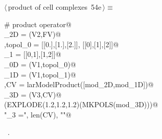 \documentclass[11pt,oneside]{article}    %
\begin{document}
\begin{flushleft} \small \label{scrap91}
\protect{}$\langle\,$product of cell complexes\nobreak\ {\footnotesize 54e}$\,\rangle\equiv$
\vspace{-1ex}
\begin{list}{}{} \item
\mbox{}\verb@# product operator@\\
\mbox{}\verb@mod_2D = (V2,FV)@\\
\mbox{},topol_0 = [[0.],[1.],[2.]], [[0],[1],[2]]@\\
\mbox{}\verb@topol_1 = [[0,1],[1,2]]@\\
\mbox{}\verb@mod_0D = (V1,topol_0)@\\
\mbox{}\verb@mod_1D = (V1,topol_1)@\\
\mbox{},CV = larModelProduct([mod_2D,mod_1D])@\\
\mbox{}\verb@mod_3D = (V3,CV)@\\
\mbox{}\verb@VIEW(EXPLODE(1.2,1.2,1.2)(MKPOLS(mod_3D)))@\\
\mbox{}\verb@print "\nk_3 =", len(CV), "\n"@\\
\mbox{}\verb@@{\NWsep}
\end{list}
\vspace{-1ex}
\footnotesize\addtolength{\baselineskip}{-1ex}
\begin{list}{}{\setlength{\itemsep}{-\parsep}\setlength{\itemindent}{-\leftmargin}}
\item \NWtxtMacroRefIn\ .
\end{list}
\end{flushleft}
\end{document}
